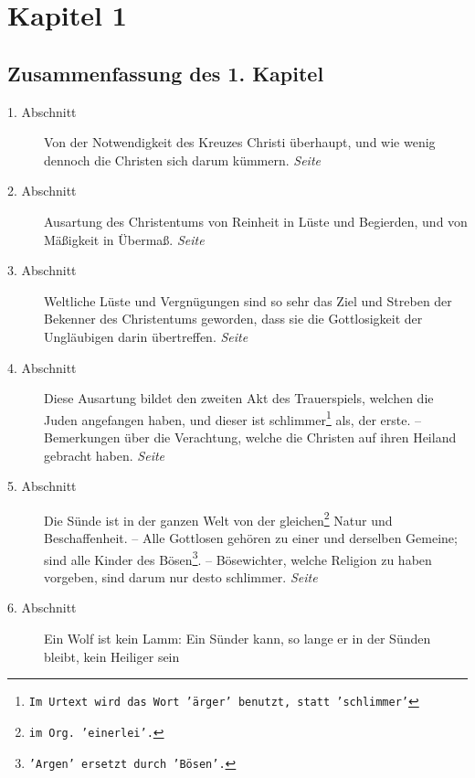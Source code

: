 

\chapter{Kapitel 1} \label{kap1}



\section{Zusammenfassung des 1. Kapitel}


\begin{description}
\item[1. Abschnitt] Von der Notwendigkeit des Kreuzes Christi überhaupt, und
wie wenig dennoch die Christen sich darum kümmern.
\dotfill \textit{Seite~\pageref{kap1_ab1}}\\
\item[2. Abschnitt] Ausartung des Christentums von Reinheit in Lüste und
Begierden, und von Mäßigkeit in Übermaß.
\dotfill \textit{Seite~\pageref{kap1_ab2}}\\
\item[3. Abschnitt] Weltliche Lüste und Vergnügungen sind so sehr das Ziel und
Streben der Bekenner des Christentums geworden, dass sie die Gottlosigkeit der
Ungläubigen darin übertreffen.
\dotfill \textit{Seite~\pageref{kap1_ab3}}\\
\item[4. Abschnitt] Diese Ausartung bildet den zweiten Akt des Trauerspiels,
welchen die Juden angefangen haben, und dieser ist schlimmer\footnote{\texttt{Im Urtext
wird das Wort 'ärger' benutzt, statt 'schlimmer'}} als, der erste. --
Bemerkungen über die Verachtung, welche die Christen auf ihren Heiland gebracht
haben.
\dotfill \textit{Seite~\pageref{kap1_ab4}}\\
\item[5. Abschnitt] Die Sünde ist in der ganzen Welt von der
gleichen\footnote{\texttt{im Org. 'einerlei'.}} Natur und Beschaffenheit. -- Alle
Gottlosen gehören zu einer und derselben Gemeine;
sind alle Kinder des Bösen\footnote{\texttt{'Argen' ersetzt durch 'Bösen'.}}. --
Bösewichter, welche Religion zu haben vorgeben, sind darum nur desto schlimmer.
\dotfill \textit{Seite~\pageref{kap1_ab5}}\\
\item[6. Abschnitt] Ein Wolf ist kein Lamm: Ein Sünder kann, so lange er in der
Sünden bleibt, kein Heiliger sein

\end{description}

